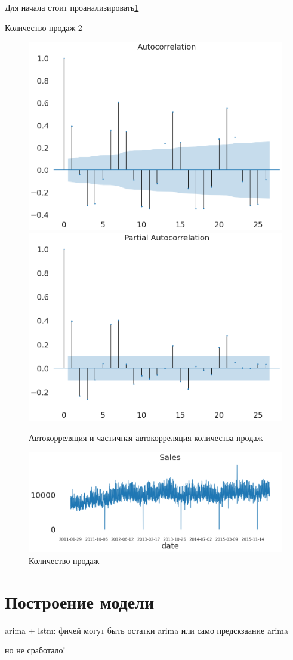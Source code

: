 Для начала стоит проанализировать\ref{img:any_autocorrelation}

Количество продаж \ref{img:all_sales}

\def\figurename{Рис}
\begin{figure}[t]
	\centering
	\includegraphics[width=0.4\columnwidth]{./img/sales_autocorrelation.png}
	\includegraphics[width=0.4\columnwidth]{./img/sales_partial_autocorrelation.png}
	\caption{Автокорреляция и частичная автокорреляция количества продаж}
	\label{img:any_autocorrelation}
\end{figure}

\def\figurename{Рис}
\begin{figure}[t]
	\centering
	\includegraphics[width=0.9\columnwidth]{./img/all_sales.png}
	\caption{Количество продаж}
	\label{img:all_sales}
\end{figure}


\section{Построение модели}

arima + lstm:
фичей могут быть остатки arima
или само предскзаание arima

но не сработало!

